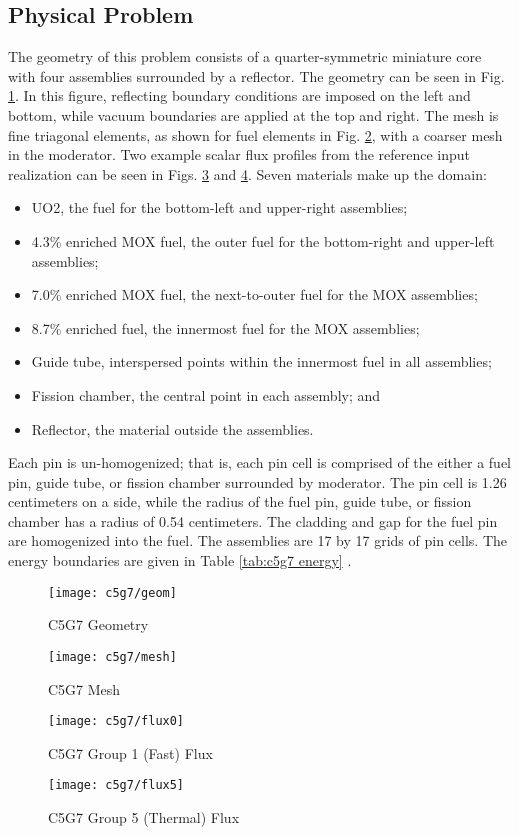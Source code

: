 \subsection{Physical Problem}
The geometry of this problem consists of a quarter-symmetric miniature core with four assemblies surrounded by
a reflector.  The geometry can be seen in Fig. \ref{fig:c5g7 geom}.  In this figure, reflecting boundary
conditions are imposed on the left and bottom, while vacuum boundaries are applied at the top and right.
The mesh is fine triagonal elements, as shown for fuel elements in Fig. \ref{fig:c5g7 mesh}, with a coarser
mesh in the moderator.
Two example scalar flux profiles from the reference input realization can be seen in Figs. \ref{fig:c5g7 flux0} and
\ref{fig:c5g7 flux1}.  Seven materials make up the domain:
\begin{itemize}
  \item UO2, the fuel for the bottom-left and upper-right assemblies;
  \item 4.3\% enriched MOX fuel, the outer fuel for the bottom-right and upper-left assemblies;
  \item 7.0\% enriched MOX fuel, the next-to-outer fuel for the MOX assemblies;
  \item 8.7\% enriched fuel, the innermost fuel for the MOX assemblies;
  \item Guide tube, interspersed points within the innermost fuel in all assemblies;
  \item Fission chamber, the central point in each assembly; and
  \item Reflector, the material outside the assemblies.
\end{itemize}
Each pin is un-homogenized; that is, each pin cell is comprised of the either a fuel pin, guide tube, or
fission chamber surrounded by moderator.  The pin cell is 1.26 centimeters on a side, while the radius of the
fuel pin, guide tube, or fission chamber has a radius of 0.54 centimeters.  The cladding and gap for the fuel
pin are homogenized into the fuel.  The assemblies are 17 by 17 grids of pin cells.  The energy boundaries are
given in Table \ref{tab:c5g7 energy} \cite{c5g7}.

\begin{figure}[htb]
  \centering
  \texttt{[image: c5g7/geom]}
  \caption{C5G7 Geometry}
  \label{fig:c5g7 geom}
\end{figure}
\begin{figure}[htb]
  \centering
  \texttt{[image: c5g7/mesh]}
  \caption{C5G7 Mesh}
  \label{fig:c5g7 mesh}
\end{figure}
\begin{figure}[htb]
  \centering
  \texttt{[image: c5g7/flux0]}
  \caption{C5G7 Group 1 (Fast) Flux}
  \label{fig:c5g7 flux0}
\end{figure}
\begin{figure}[htb]
  \centering
  \texttt{[image: c5g7/flux5]}
  \caption{C5G7 Group 5 (Thermal) Flux}
  \label{fig:c5g7 flux1}
\end{figure}

